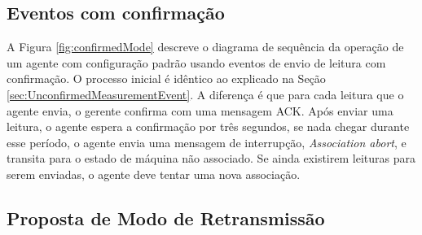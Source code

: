 \subsection{Eventos com confirmação}



A Figura \ref{fig:confirmedMode} descreve o diagrama de sequência da operação de um agente com configuração padrão usando eventos de envio de leitura com confirmação. O processo inicial é idêntico ao explicado na Seção \ref{sec:UnconfirmedMeasurementEvent}. A diferença é que para cada leitura que o agente envia, o gerente confirma com uma mensagem ACK. Após enviar uma leitura, o agente espera a confirmação por três segundos, se nada chegar durante esse período, o agente envia uma mensagem de interrupção, \textit{Association abort}, e transita para o estado de máquina não associado. Se ainda existirem leituras para serem enviadas, o agente deve tentar uma nova associação.

\subsection{Proposta de Modo de Retransmissão}

